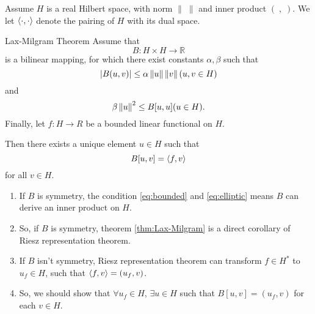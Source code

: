 Assume $H$ is a real Hilbert space, with norm $\|\;\|$ and inner product $(\;,\;)$. We let $\left<\cdot,\cdot\right>$ denote the pairing of $H$ with its dual space.
\begin{theorem}{Lax-Milgram Theorem}
    \label{thm:Lax-Milgram}
    Assume that 
    \begin{equation}
        \label{eq:bilinear_form_B}
        B:H\times H\rightarrow\mathbb{R}
    \end{equation}
    is a bilinear mapping, for which there exist constants $\alpha,\beta$ such that 
    \begin{equation}
        \label{eq:bounded}
        |B(u,v)|\le \alpha \left\|u\right\|\left\|v\right\|(u,v\in H)
    \end{equation}
    and 
    \begin{equation}
        \label{eq:elliptic}
        \beta\left\|u\right\|^{2}\le B[u,u](u\in H).
    \end{equation}
    Finally, let $f:H\rightarrow R$ be a bounded linear functional on $H$.

    Then there exists a unique element $u\in H$ such that 
    \begin{equation}
        \label{eq:Lax-Milgram}
        B[u,v]=\left<f,v\right>
    \end{equation}
    for all $v\in H$.
\end{theorem}
\begin{remark}
    \begin{enumerate}
        \item If $B$ is symmetry, the condition \eqref{eq:bounded} and \eqref{eq:elliptic} means $B$ can derive an inner product on $H$.
        \item So, if $B$ is symmetry, theorem \ref{thm:Lax-Milgram} is a direct corollary of Riesz representation theorem.
        \item If $B$ isn't symmetry, Riesz representation theorem can transform $f\in H^{*}$ to $u_{f}\in H$, such that $\left<f,v\right>=(u_{f},v)$.
        \item So, we should show that $\forall u_{f}\in H$, $\exists u\in H$ such that $B[u,v]=(u_{f},v)$ for each $v\in H$.
    \end{enumerate}
\end{remark}
